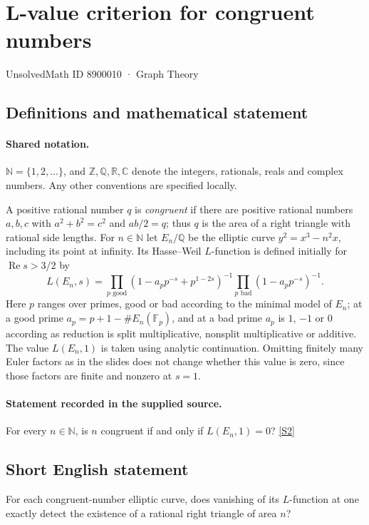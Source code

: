 \documentclass[11pt]{article}
\newcommand{\sref}[2]{\hyperlink{source:#1:#2}{[S#2]}}
\begin{document}
\setcounter{section}{8900009}
\section{L-value criterion for congruent numbers}\label{8900010}
{\small\sffamily UnsolvedMath ID 8900010 · Graph Theory}
\subsection{Definitions and mathematical statement}

\paragraph{Shared notation.}$\mathbb N=\{1,2,\ldots\}$, and $\mathbb Z,\mathbb Q,\mathbb R,\mathbb C$ denote the integers, rationals, reals and complex numbers. Any other conventions are specified locally.


A positive rational number $q$ is \emph{congruent} if there are positive rational numbers $a,b,c$ with $a^2+b^2=c^2$ and $ab/2=q$; thus $q$ is the area of a right triangle with rational side lengths.
For $n\in\mathbb N$ let $E_n/\mathbb Q$ be the elliptic curve $y^2=x^3-n^2x$, including its point at infinity. Its Hasse--Weil $L$-function is defined initially for $\operatorname{Re}s>3/2$ by
\[
L(E_n,s)=\prod_{p\text{ good}}(1-a_pp^{-s}+p^{1-2s})^{-1}
\prod_{p\text{ bad}}(1-a_pp^{-s})^{-1}.
\]
Here $p$ ranges over primes, good or bad according to the minimal model of $E_n$; at a good prime $a_p=p+1-\#E_n(\mathbb F_p)$, and at a bad prime $a_p$ is $1$, $-1$ or $0$ according as reduction is split multiplicative, nonsplit multiplicative or additive. The value $L(E_n,1)$ is taken using analytic continuation. Omitting finitely many Euler factors as in the slides does not change whether this value is zero, since those factors are finite and nonzero at $s=1$.
\paragraph{Statement recorded in the supplied source.}
For every $n\in\mathbb N$, is $n$ congruent if and only if $L(E_n,1)=0$? \sref{8900010}{2}
\subsection{Short English statement}
For each congruent-number elliptic curve, does vanishing of its $L$-function at one exactly detect the existence of a rational right triangle of area $n$?
\end{document}
